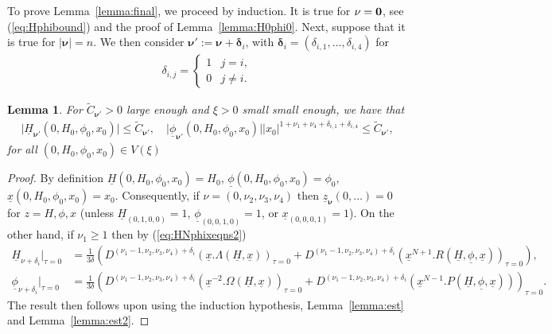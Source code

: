 \documentclass[reqno,12pt]{amsart}
\renewcommand{\eqref}[1]{(\ref{eq:#1})}
\newcommand{\lemmaref}[1]{Lemma~\ref{lemma:#1}}
\newcommand{\lemmalab}[1]{\label{lemma:#1}}
\newtheorem{lemma}[theorem]{Lemma}
\numberwithin{equation}{section}
\begin{document}
To prove \lemmaref{final}, we proceed by induction. It is true for $\mathbf \nu=\textbf 0$, see \eqref{Hphibound} and the proof of \lemmaref{H0phi0}. Next, suppose that it is true for $\vert \mathbf \nu\vert =n$. We then consider $\mathbf \nu':=\mathbf \nu+\mathbf \delta_i$, with $\mathbf \delta_i = (\delta_{i,1},\ldots,\delta_{i,4})$ for
\begin{align*}
 \delta_{i,j} = \begin{cases}
                 1 & j=i,\\
                 0 & j\ne i.
                \end{cases}
\end{align*}
\begin{lemma}\lemmalab{ic}
 For $\widetilde C_{\mathbf \nu'}>0$ large enough and $\xi>0$ small small enough, we have that 
\begin{align*}
 \vert \underline H_{\mathbf\nu'}(0,H_0,\phi_0,x_0)\vert\le  \widetilde  C_{\mathbf \nu'},\quad  \vert \underline \phi_{\mathbf\nu'}(0,H_0,\phi_0,x_0)\vert \vert x_0\vert^{1+\nu_1+\nu_4+\delta_{i,1}+\delta_{i,4}} \le \widetilde  C_{\mathbf \nu'},
\end{align*}
for all $(0,H_0,\phi_0,x_0)\in V(\xi)$
\end{lemma}
\begin{proof}
 By definition $\underline H(0,H_0,\phi_0,x_0)=H_0$, $\underline \phi(0,H_0,\phi_0,x_0)=\phi_0$, $\underline x(0,H_0,\phi_0,x_0)=x_0$. Consequently, if $\nu=(0,\nu_2,\nu_3,\nu_4)$ then $\underline z_{\mathbf \nu}(0,\ldots)=0$ for $z=H,\phi,x$ (unless $\underline H_{(0,1,0,0)}=1$, $\underline \phi_{(0,0,1,0)}=1$, or $\underline x_{(0,0,0,1)}=1$). On the other hand, if $\nu_1\ge 1$ then 
by \eqref{HNphixeqns2}
 \begin{align*}
  \underline H_{\mathbb \nu+\mathbb \delta_{i}}\big\vert_{\tau=0} &= \frac{1}{3\delta}\left( D^{(\nu_1-1,\nu_2,\nu_3,\nu_4)+\mathbb \delta_{i}}(\underline x. \Lambda(\underline H,\underline x))_{\tau=0}+D^{(\nu_1-1,\nu_2,\nu_3,\nu_4)+\mathbb \delta_{i}} (\underline x^{N+1}. R(\underline H,\underline \phi,\underline  x))_{\tau=0}\right),\\
  \underline \phi_{\nu+\mathbb \delta_{i}}\big\vert_{\tau=0} &=\frac{1}{3\delta}\left( D^{(\nu_1-1,\nu_2,\nu_3,\nu_4)+\mathbb \delta_{i}}(\underline x^{-2} .\Omega(\underline H,\underline x))_{\tau=0}+D^{(\nu_1-1,\nu_2,\nu_3,\nu_4)+\mathbb \delta_{i}} (\underline x^{N-1}. P(\underline H,\underline \phi,\underline  x))\right)_{\tau=0}.
 \end{align*}
The result then follows upon using the induction hypothesis, \lemmaref{est} and \lemmaref{est2}.
 
 
 \end{proof}
\end{document}
